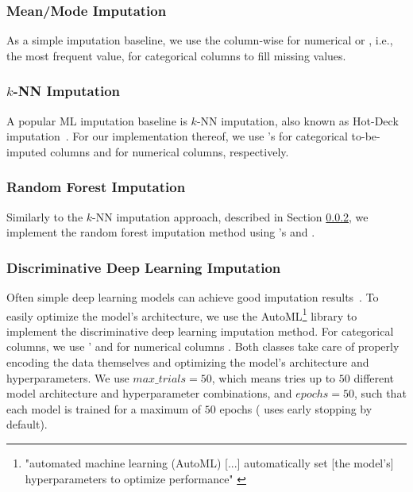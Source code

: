 \subsubsection{Mean/Mode Imputation}
\label{sec:simple_imputation}
%
As a simple imputation baseline, we use the column-wise  for numerical or , i.e., the most frequent value,  for categorical columns to fill missing values.


\subsubsection{$k$-NN Imputation}
\label{sec:knKNN}
%
A popular ML imputation baseline is $k$-NN imputation, also known as Hot-Deck imputation~\citep{Batista2003}. For our implementation thereof, we use 's  for categorical to-be-imputed columns and  for numerical columns, respectively.


\subsubsection{Random Forest Imputation}
%
Similarly to the $k$-NN imputation approach, described in Section \ref{sec:knKNN}, we implement the random forest imputation method using 's  and .



\subsubsection{Discriminative Deep Learning Imputation}
\label{sec:dl_imputation}
%
Often simple deep learning models can achieve good imputation results~\citep{Biessmann2018a}. To easily optimize the model's architecture, we use the AutoML\footnote{"automated machine learning (AutoML) [...] automatically set [the model's] hyperparameters to optimize performance" \cite{AutoML}} library  \citep{AutoKeras} to implement the discriminative deep learning imputation method.
For categorical columns, we use '  and for numerical columns . Both classes take care of properly encoding the data themselves and optimizing the model's architecture and hyperparameters. We use $max\_trials = 50$, which means  tries up to $50$ different model architecture and hyperparameter combinations, and $epochs = 50$, such that each model is trained for a maximum of $50$ epochs ( uses early stopping by default).


